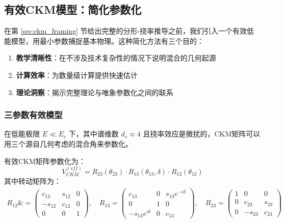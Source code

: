 \subsection{有效CKM模型：简化参数化}
\label{sec:ckm_effective}

在第 \ref{sec:ckm_framing} 节给出完整的分形-挠率推导之前，我们引入一个有效低能模型，用最小参数捕捉基本物理。这种简化方法有三个目的：

\begin{enumerate}
    \item \textbf{教学清晰性}：在不涉及技术复杂性的情况下说明混合的几何起源
    \item \textbf{计算效率}：为数量级计算提供快速估计
    \item \textbf{理论洞察}：揭示完整理论与唯象参数化之间的联系
\end{enumerate}

\subsubsection{三参数有效模型}

在低能极限 $E \ll E_c$ 下，其中谱维数 $d_s \approx 4$ 且挠率效应是微扰的，CKM矩阵可以用三个源自几何考虑的混合角来参数化。

\begin{model}[有效几何CKM]
有效CKM矩阵参数化为：
\begin{equation}
    V_{CKM}^{(eff)} = R_{23}(\theta_{23}) \cdot R_{13}(\theta_{13}, \delta) \cdot R_{12}(\theta_{12})
\end{equation}
其中转动矩阵为：
\begin{align}
    R_{12} \&= \begin{pmatrix} c_{12} & s_{12} & 0 \\ -s_{12} & c_{12} & 0 \\ 0 & 0 & 1 \end{pmatrix}, \quad
    R_{13} = \begin{pmatrix} c_{13} & 0 & s_{13}e^{-i\delta} \\ 0 & 1 & 0 \\ -s_{13}e^{i\delta} & 0 & c_{13} \end{pmatrix}, \quad
    R_{23} = \begin{pmatrix} 1 & 0 & 0 \\ 0 & c_{23} & s_{23} \\ 0 & -s_{23} & c_{23} \end{pmatrix}
\end{align}
\end{model}

